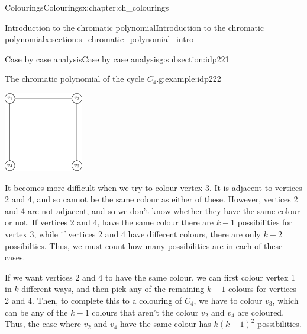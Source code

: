 \documentclass[oneside,10pt,]{book}
\numberwithin{equation}{section}
\begin{document}
\begin{chapterptx}{Colourings}{}{Colourings}{}{}{x:chapter:ch_colourings}
\begin{sectionptx}{Introduction to the chromatic polynomial}{}{Introduction to the chromatic polynomial}{}{}{x:section:s_chromatic_polynomial_intro}
\begin{subsectionptx}{Case by case analysis}{}{Case by case analysis}{}{}{g:subsection:idp221}
\begin{example}{The chromatic polynomial of the cycle \(C_4\).}{g:example:idp222}
\begin{sidebyside}{2}{0.025}{0.025}{0.05}
\begin{sbspanel}{0.6}
\end{sbspanel}%
\begin{sbspanel}{0.3}%
\includegraphics[width=\linewidth]{images/c4.png}
\end{sbspanel}%
\end{sidebyside}%
It becomes more difficult when we try to colour vertex 3.  It is adjacent to vertices 2 and 4, and so cannot be the same colour as either of these.  However, vertices 2 and 4 are not adjacent, and so we don't know whether they have the same colour or not.  If vertices 2 and 4, have the same colour there are \(k-1\) possibilities for vertex 3, while if vertices 2 and 4 have different colours, there are only \(k-2\) possibilties.  Thus, we must count how many possibilities are in each of these cases.%
\par
If we want vertices 2 and 4 to have the same colour, we can first colour vertex 1 in \(k\) different ways, and then pick any of the remaining \(k-1\) colours for vertices 2 and 4.  Then, to complete this to a colouring of \(C_4\), we have to colour \(v_3\), which can be any of the \(k-1\) colours that aren't the colour \(v_2\) and \(v_4\) are coloured.  Thus, the case where \(v_2\) and \(v_4\) have the same colour has \(k(k-1)^2\) possibilities.%
\par

\end{example}
\end{subsectionptx}
\end{sectionptx}
\end{chapterptx}
\end{document}
